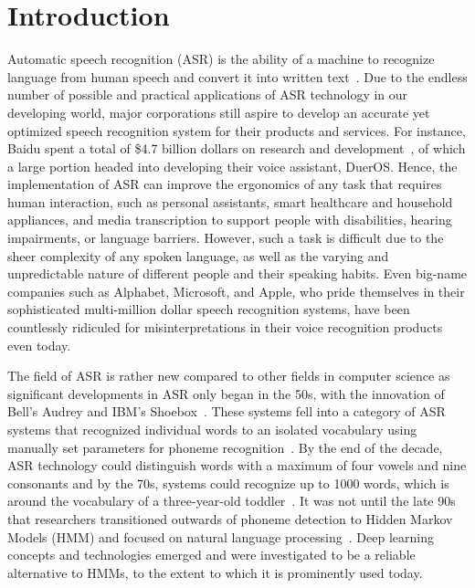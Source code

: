 
\chapter{Introduction} %

\label{Introduction} %

Automatic speech recognition (ASR) is the ability of a machine to recognize language from human speech and convert it into written text~\cite{wang_2021}. Due to the endless number of possible and practical applications of ASR technology in our developing world, major corporations still aspire to develop an accurate yet optimized speech recognition system for their products and services. For instance, Baidu spent a total of \$4.7 billion dollars on research and development~\cite{thomala_2022}, of which a large portion headed into developing their voice assistant, DuerOS. Hence, the implementation of ASR can improve the ergonomics of any task that requires human interaction, such as personal assistants, smart healthcare and household appliances, and media transcription to support people with disabilities, hearing impairments, or language barriers. However, such a task is difficult due to the sheer complexity of any spoken language, as well as the varying and unpredictable nature of different people and their speaking habits. Even big-name companies such as Alphabet, Microsoft, and Apple, who pride themselves in their sophisticated multi-million dollar speech recognition systems, have been countlessly ridiculed for misinterpretations in their voice recognition products even today.
\par
The field of ASR is rather new compared to other fields in computer science as significant developments in ASR only began in the 50s, with the innovation of Bell’s Audrey and IBM’s Shoebox~\cite{sonix_authors_2022,summa_linguae_authors_2021}. These systems fell into a category of ASR systems that recognized individual words to an isolated vocabulary using manually set parameters for phoneme recognition~\cite{summa_linguae_authors_2021}. By the end of the decade, ASR technology could distinguish words with a maximum of four vowels and nine consonants and by the 70s, systems could recognize up to 1000 words, which is around the vocabulary of a three-year-old toddler~\cite{sonix_authors_2022}. It was not until the late 90s that researchers transitioned outwards of phoneme detection to Hidden Markov Models (HMM) and focused on natural language processing~\cite{summa_linguae_authors_2021}. Deep learning concepts and technologies emerged and were investigated to be a reliable alternative to HMMs, to the extent to which it is prominently used today.
